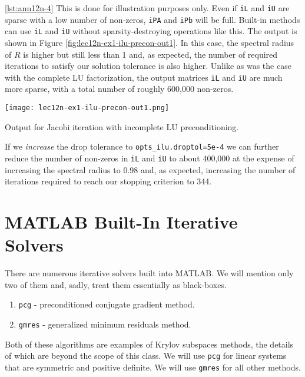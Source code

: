 \noindent \ref{lst:ann12n-4} This is done for illustration purposes only.  Even if \lstinline[style=myMatlab]{iL} and \lstinline[style=myMatlab]{iU} are sparse with a low number of non-zeros, \lstinline[style=myMatlab]{iPA} and \lstinline[style=myMatlab]{iPb} will be full.  Built-in methods can use \lstinline[style=myMatlab]{iL} and \lstinline[style=myMatlab]{iU} without sparsity-destroying operations like this.
The output is shown in Figure \ref{fig:lec12n-ex1-ilu-precon-out1}.  In this case, the spectral radius of $R$ is higher but still less than 1 and, as expected, the number of required iterations to satisfy our solution tolerance is also higher.  Unlike as was the case with the complete LU factorization, the output matrices \lstinline[style=myMatlab]{iL} and \lstinline[style=myMatlab]{iU} are much more sparse, with a total number of roughly 600,000 non-zeros.  
\begin{marginfigure}
\texttt{[image: lec12n-ex1-ilu-precon-out1.png]}
\caption{Output for Jacobi iteration with incomplete LU preconditioning.}
\label{fig:lec12n-ex1-ilu-precon-out1}
\end{marginfigure}
If we \emph{increase} the drop tolerance to \lstinline[style=myMatlab]{opts_ilu.droptol=5e-4} we can further reduce the number of non-zeros in \lstinline[style=myMatlab]{iL} and \lstinline[style=myMatlab]{iU} to about 400,000 at the expense of increasing the spectral radius to 0.98 and, as expected, increasing the number of iterations required to reach our stopping criterion to 344.

\section{MATLAB Built-In Iterative Solvers}
There are numerous iterative solvers built into MATLAB.  We will mention only two of them and, sadly, treat them essentially as black-boxes.   
\begin{enumerate}
\item \lstinline[style=myMatlab]{pcg} - preconditioned conjugate gradient method.  
\item \lstinline[style=myMatlab]{gmres} - generalized minimum residuals method.
\end{enumerate}
Both of these algorithms are examples of Krylov subspaces methods, the details of which are beyond the scope of this class. We will use \lstinline[style=myMatlab]{pcg} for linear systems that are symmetric and positive definite.  We will use \lstinline[style=myMatlab]{gmres} for all other methods.  

